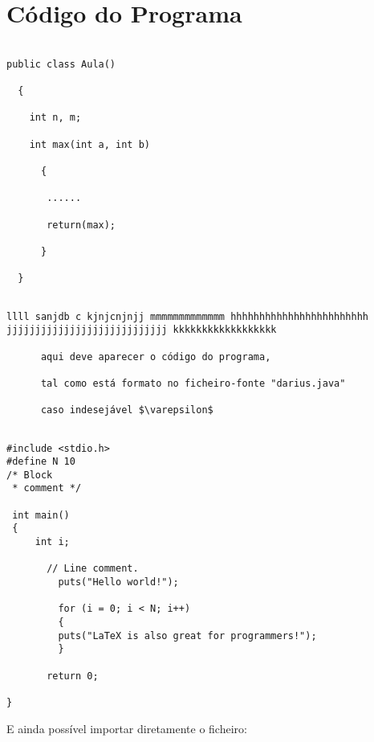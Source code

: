 \documentclass[pdftex,12pt,a4paper]{report}
\begin{document}

\begin{abstract}





\end{abstract}

\tableofcontents









\appendix

\chapter{Código do Programa}




\begin{verbatim}

public class Aula()

  {

    int n, m;

    int max(int a, int b)

      {

       ......

       return(max);

      }

  }

\end{verbatim}



\begin{verbatim}

llll sanjdb c kjnjcnjnjj mmmmmmmmmmmmm hhhhhhhhhhhhhhhhhhhhhhhh
jjjjjjjjjjjjjjjjjjjjjjjjjjjj kkkkkkkkkkkkkkkkkk

      aqui deve aparecer o código do programa,

      tal como está formato no ficheiro-fonte "darius.java"

      caso indesejável $\varepsilon$

\end{verbatim}



\begin{verbatim}

#include <stdio.h>
#define N 10
/* Block
 * comment */

 int main()
 {
     int i;
	 
	   // Line comment.
		 puts("Hello world!");
			     
		 for (i = 0; i < N; i++)
		 {
		 puts("LaTeX is also great for programmers!");
		 }
										 
	   return 0;
				
}
\end{verbatim}


E ainda possível importar diretamente o ficheiro:










\end{document}
